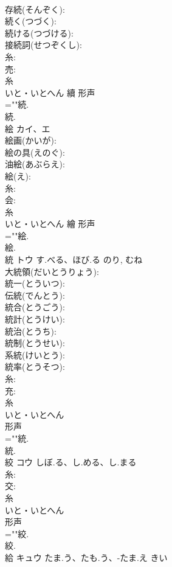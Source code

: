 \documentclass[8pt]{extreport}
\begin{document}
\begin{CJK}{UTF8}{min}
\\	存続(そんぞく): 
\\	続く(つづく): 
\\	続ける(つづける): 
\\	接続詞(せつぞくし): 
\\	糸: 
\\	売: 
\\	糸	
\\	いと・いとへん	續	形声 
\\	=""続.
\\	続.
\\	絵	カイ、エ			
\\	絵画(かいが): 
\\	絵の具(えのぐ): 
\\	油絵(あぶらえ): 
\\	絵(え): 
\\	糸: 
\\	会: 
\\	糸	
\\	いと・いとへん	繪	形声 
\\	=""絵.
\\	絵.
\\	統	トウ	す.べる、ほび.る	のり, むね	
\\	大統領(だいとうりょう): 
\\	統一(とういつ): 
\\	伝統(でんとう): 
\\	統合(とうごう): 
\\	統計(とうけい): 
\\	統治(とうち): 
\\	統制(とうせい): 
\\	系統(けいとう): 
\\	統率(とうそつ): 
\\	糸: 
\\	充: 
\\	糸	
\\	いと・いとへん	
\\	形声 
\\	=""統.
\\	統.
\\	絞	コウ	しぼ.る、し.める、し.まる		
\\	糸: 
\\	交: 
\\	糸	
\\	いと・いとへん	
\\	形声 
\\	=""絞.
\\	絞.
\\	給	キュウ	たま.う、たも.う、-たま.え	きい	

\end{CJK}
\end{document}
